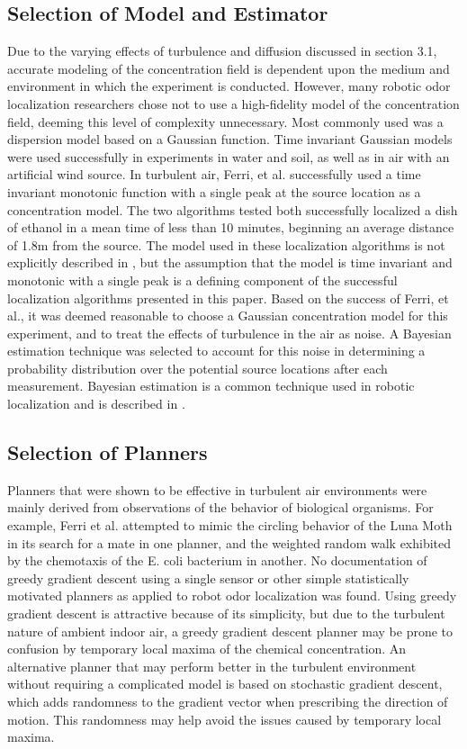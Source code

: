 \documentclass[submit, 12pt]{aiaa-pretty-modified}
\begin{document}
\subsection{Selection of Model and Estimator}
Due to the varying effects of turbulence and diffusion discussed in section 3.1,
accurate modeling of the concentration field is dependent upon the medium and
environment in which the experiment is conducted. However, many robotic odor
localization researchers chose not to use a high-fidelity model of the
concentration field, deeming this level of complexity unnecessary.
\cite{kowadlo} Most commonly used was a dispersion model based on a Gaussian
function. Time invariant Gaussian models were used successfully in experiments
in water and soil, as well as in air with an artificial wind source.
\cite{kowadlo} In turbulent air, Ferri, et al. successfully used a time
invariant monotonic function with a single peak at the source location as a
concentration model. \cite{ferri} The two algorithms tested both successfully
localized a dish of ethanol in a mean time of less than 10 minutes, beginning an
average distance of 1.8m from the source. The model used in these localization
algorithms is not explicitly described in \cite{ferri}, but the assumption that
the model is time invariant and monotonic with a single peak is a defining
component of the successful localization algorithms presented in this paper.
Based on the success of Ferri, et al., it was deemed reasonable to choose a
Gaussian concentration model for this experiment, and to treat the effects of
turbulence in the air as noise. A Bayesian estimation technique
was selected to account for this noise in determining a probability distribution
over the potential source locations after each measurement. Bayesian estimation
is a common technique used in robotic localization and is described in
\cite{bergman}.

\subsection{Selection of Planners}
Planners that were shown to be effective in turbulent air environments were
mainly derived from observations of the behavior of biological organisms.
\cite{ferri} For example, Ferri et al. attempted to mimic the circling behavior
of the Luna Moth in its search for a mate in one planner, and the weighted
random walk exhibited by the chemotaxis of the E. coli bacterium in another.
\cite{ferri} No documentation of greedy gradient descent using a single sensor
or other simple statistically motivated planners as applied to robot odor
localization was found. Using greedy gradient descent is attractive because of
its simplicity, but due to the turbulent nature of ambient indoor air, a greedy
gradient descent planner may be prone to confusion by temporary local maxima of
the chemical concentration. An alternative planner that may perform better in
the turbulent environment without requiring a complicated model is based on
stochastic gradient descent, which adds randomness to the gradient vector when
prescribing the direction of motion. \cite{bottou} This randomness may help
avoid the issues caused by temporary local maxima.
\end{document}
